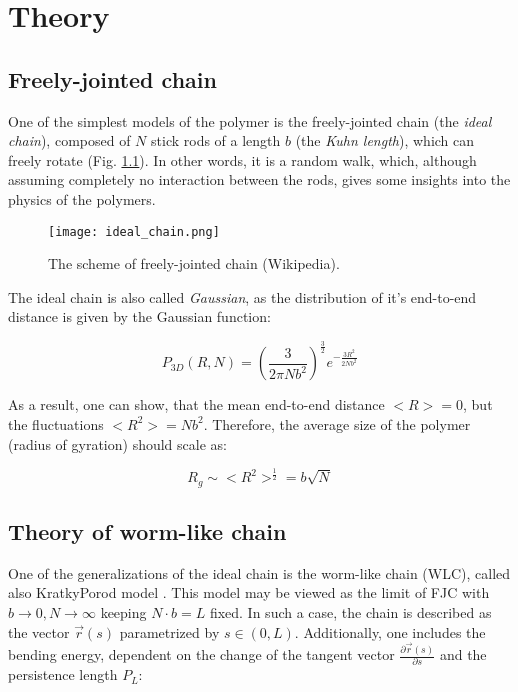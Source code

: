 \chapter{Theory}
\label{chap:theory}

\section{Freely-jointed chain}
\label{sec:theory_fjc}
One of the simplest models of the polymer is the freely-jointed chain (the \textit{ideal chain}), composed of $N$ stick rods of a length $b$ (the \textit{Kuhn length}), which can freely rotate (Fig. \ref{fig:theory_fjc}).
In other words, it is a random walk, which, although assuming completely no interaction between the rods, gives some insights into the physics of the polymers.

\begin{figure}
    \texttt{[image: ideal\_chain.png]}
    \caption{The scheme of freely-jointed chain (Wikipedia).}
    \label{fig:theory_fjc}
\end{figure}

The ideal chain is also called \textit{Gaussian}, as the distribution of it's end-to-end distance is given by the Gaussian function:

\begin{equation}
    P_{3D}(R, N) = \left( \frac{3}{2\pi N b^2}\right)^\frac{3}{2} e^{-\frac{3R^2}{2Nb^2}}
\end{equation}

As a result, one can show, that the mean end-to-end distance $<R>=0$, but the fluctuations $<R^2>=Nb^2$.
Therefore, the average size of the polymer (radius of gyration) should scale as:

\begin{equation}
    \boxed{R_g \sim <R^2>^\frac{1}{2}=b\sqrt{N}}
\end{equation}

\section{Theory of worm-like chain}
\label{sec:theory_wlc}
One of the generalizations of the ideal chain is the worm-like chain (WLC), called also Kratky\-Porod model \cite{kratky1949rontgenuntersuchung}.
This model may be viewed as the limit of FJC with $b\rightarrow 0, N\rightarrow\infty$ keeping $N\cdot b= L$ fixed.
In such a case, the chain is described as the vector $\overrightarrow{r}(s)$ parametrized by $s\in (0,L)$.
Additionally, one includes the bending energy, dependent on the change of the tangent vector $\frac{\partial\overrightarrow{r}(s)}{\partial s}$ and the persistence length $P_L$:

